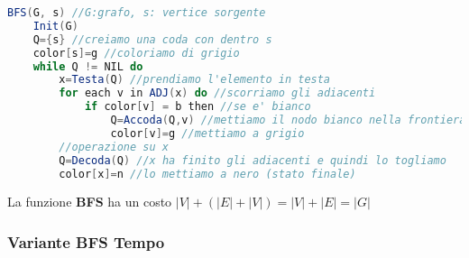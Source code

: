 \begin{lstlisting}[language=Java]
BFS(G, s) //G:grafo, s: vertice sorgente
    Init(G)
    Q={s} //creiamo una coda con dentro s 
    color[s]=g //coloriamo di grigio 
    while Q != NIL do 
        x=Testa(Q) //prendiamo l'elemento in testa 
        for each v in ADJ(x) do //scorriamo gli adiacenti
            if color[v] = b then //se e' bianco 
                Q=Accoda(Q,v) //mettiamo il nodo bianco nella frontiera 
                color[v]=g //mettiamo a grigio 
        //operazione su x
        Q=Decoda(Q) //x ha finito gli adiacenti e quindi lo togliamo
        color[x]=n //lo mettiamo a nero (stato finale)
\end{lstlisting}
La funzione \textbf{BFS} ha un costo $|V| + (|E|+|V|) = |V|+|E|=|G|$

\subsubsection{Variante BFS Tempo}
\blindtext